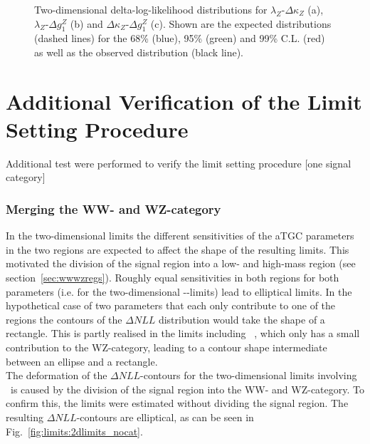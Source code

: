 \begin{figure}
	\centering
	\caption[Two-dimensional delta-log-likelihood distributions for the three combinations of aTGC parameters in the vertex parametrization]{Two-dimensional delta-log-likelihood distributions for $\lambda_Z$-$\Delta\kappa_Z$ (a), $\lambda_Z$-$\Delta g_1^Z$ (b) and $\Delta\kappa_Z$-$\Delta g_1^Z$ (c). Shown are the expected distributions (dashed lines) for the 68\% (blue), 95\% (green) and 99\% C.L. (red) as well as the observed distribution (black line).}
	\label{fig:limits:2dlimitsvertex}	
\end{figure}

\section{Additional Verification of the Limit Setting Procedure}
\label{sec:limits:atgcint}
Additional test were performed to verify the limit setting procedure 
[one signal category]
\subsubsection*{Merging the WW- and WZ-category}

In the two-dimensional limits the different sensitivities of the aTGC parameters in the two regions are expected to affect the shape of the resulting limits. This motivated the division of the signal region into a low- and high-mass region (see section~\ref{sec:wwwzregs}). Roughly equal sensitivities in both regions for both parameters (i.e. for the two-dimensional \Tcwww -\Tccw -limits) lead to elliptical limits. In the hypothetical case of two parameters that each only contribute to one of the regions the contours of the $\Delta NLL$ distribution would take the shape of a rectangle. This is partly realised in the limits including \Tcb \ , which only has a small contribution to the WZ-category, leading to a contour shape intermediate between an ellipse and a rectangle.\\

\noindent The deformation of the $\Delta NLL$-contours for the two-dimensional limits involving \Tcb \ is caused by the division of the signal region into the WW- and WZ-category. To confirm this, the limits were estimated without dividing the signal region. The resulting $\Delta NLL$-contours are elliptical, as can be seen in Fig.~\ref{fig:limits:2dlimits_nocat}.

